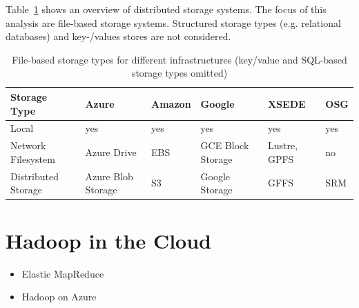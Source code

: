 \documentclass[times]{cpeauth}
\begin{document}
Table~\ref{tab:storage-systems} shows an overview of distributed storage 
systems. The focus of this analysis are file-based storage systems. Structured
storage types (e.g. relational databases) and key-/values stores are not 
considered.

\begin{table}[t]
\begin{tabular}{|p{1.3cm}|p{1cm}|p{1cm}|p{1cm}|p{1cm}|p{1cm}|}
	\hline
	\textbf{Storage Type} &\textbf{Azure} &\textbf{Amazon} &\textbf{Google} &\textbf{XSEDE}  &\textbf{OSG} \\
	\hline
	Local	&yes &yes &yes &yes &yes\\
	\hline
	Network Filesystem &Azure Drive &EBS &GCE Block Storage &Lustre, GPFS 
	&no\\
	\hline
	Distributed Storage &Azure Blob Storage &S3 &Google Storage &GFFS
	 &SRM\\
	\hline	
\end{tabular}
\caption{File-based storage types for different infrastructures (key/value and 
SQL-based storage types omitted) \label{tab:storage-systems}}
\end{table}

\section{Hadoop in the Cloud}

\begin{itemize}
	\item Elastic MapReduce
	\item Hadoop on Azure
\end{itemize}



\end{document}
